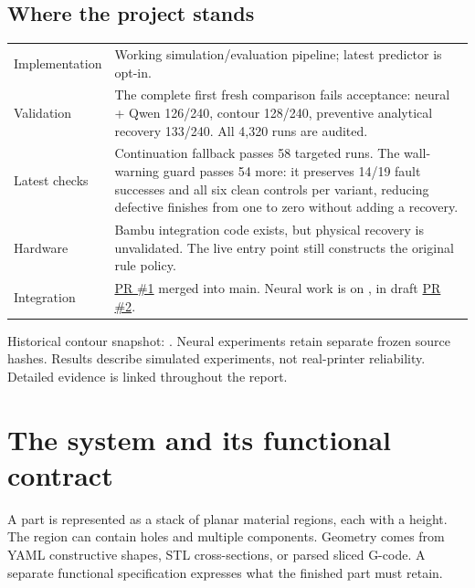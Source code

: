 \documentclass[10pt,letterpaper]{article}
\newcommand{\code}[1]{\texttt{\detokenize{#1}}}
\newcommand{\nextpage}{\clearpage}
\begin{document}
\subsection*{Where the project stands}
\begin{tabularx}{\linewidth}{@{}p{1.45in}Y@{}}
\toprule
Implementation & Working simulation/evaluation pipeline; latest predictor is opt-in.\\
Validation & The complete first fresh comparison fails acceptance: neural + Qwen 126/240, contour 128/240, preventive analytical recovery 133/240. All 4,320 runs are audited.\\
Latest checks & Continuation fallback passes 58 targeted runs. The wall-warning guard passes 54 more: it preserves 14/19 fault successes and all six clean controls per variant, reducing defective finishes from one to zero without adding a recovery.\\
Hardware & Bambu integration code exists, but physical recovery is unvalidated. The live entry point still constructs the original rule policy.\\
Integration & \href{https://github.com/3D-Printing-Failure-Detection/failure-detection/pull/1}{PR \#1} merged into main. Neural work is on \code{work/neural-local-recovery}, in draft \href{https://github.com/3D-Printing-Failure-Detection/failure-detection/pull/2}{PR \#2}.\\
\bottomrule
\end{tabularx}

{\small\color{muted}Historical contour snapshot: \code{9770276}. Neural experiments
retain separate frozen source hashes. Results describe simulated experiments,
not real-printer reliability. Detailed evidence is linked
throughout the report.}

\nextpage
\section{The system and its functional contract}

A part is represented as a stack of planar material regions, each with a height.
The region can contain holes and multiple components. Geometry comes from YAML
constructive shapes, STL cross-sections, or parsed sliced G-code. A separate
functional specification expresses what the finished part must retain.
\end{document}
